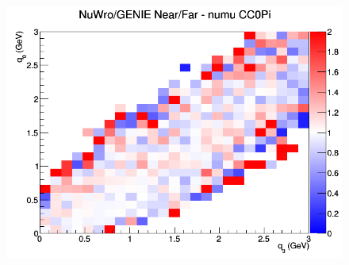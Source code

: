 \documentclass[12pt]{article}
\begin{document}
\begin{figure}[h]
\endminipage
{}
\includegraphics[width=\linewidth]{eff_q0_q3/GAr/ratios/CC0Pi_NuWro_GENIE_numu_NF_q3_q0.png}
\endminipage
\newline
\end{figure}
\clearpage
\end{document}
